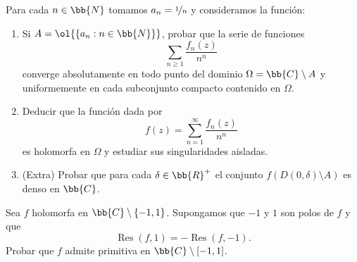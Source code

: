 \documentclass[12pt]{article}
\DeclareMathOperator{\Res}{Res}
\begin{document}
    \begin{ejercicio}[2.5 puntos]
        Para cada $n \in \bb{N}$ tomamos $a_n = \nicefrac{1}{n}$ y consideramos la función:
        \begin{enumerate}
            \item Si $A = \ol{\{a_n : n \in \bb{N}\}}$, probar que la serie de funciones
            \[
                \sum_{n \geq 1} \frac{f_n(z)}{n^n}
            \]
            converge absolutamente en todo punto del dominio $\Omega = \bb{C}\setminus A$ y uniformemente en cada subconjunto compacto contenido en $\Omega$.
            \item Deducir que la función dada por
            \[
                f(z) = \sum_{n=1}^{\infty} \frac{f_n(z)}{n^n}
            \]
            es holomorfa en $\Omega$ y estudiar sus singularidades aisladas.

            \item (Extra) Probar que para cada $\delta\in \bb{R}^+$ el conjunto $f\left(D(0,\delta)\setminus A\right)$ es denso en $\bb{C}$.
        \end{enumerate}
    \end{ejercicio}

    \begin{ejercicio}[2.5 puntos]
        Sea $f$ holomorfa en $\bb{C}\setminus\{-1, 1\}$. Supongamos que $-1$ y $1$ son polos de $f$ y que
        \[
            \Res(f, 1) = -\Res(f, -1).
        \]
        Probar que $f$ admite primitiva en $\bb{C} \setminus [-1, 1]$.
    \end{ejercicio}



    \newpage
    \setcounter{ejercicio}{0}
\end{document}
